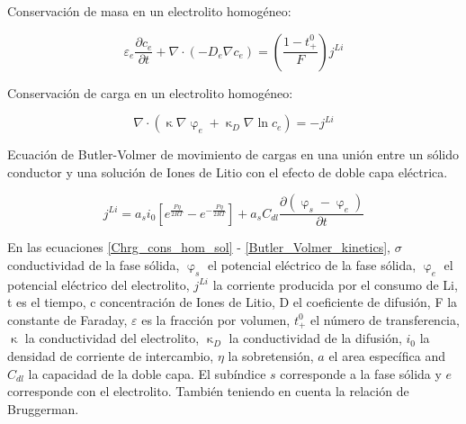 \documentclass[10pt,a4paper]{article}
\begin{document}
Conservación de masa en un electrolito homogéneo:\\

\begin{figure}[h!]
	\begin{center}
		\begin{equation}
		\varepsilon_e\frac{\partial c_e}{\partial t} + \nabla \cdot (-D_e\nabla c_e) = (\frac{1-t_+^0}{F})j^{Li}
		\label{Mass_cons_hom_electrolyte}
		\end{equation}	
	\end{center}
\end{figure}

Conservación de carga en un electrolito homogéneo:\\

\begin{figure}[h!]
	\begin{center}
		\begin{equation}
		\nabla \cdot (\upkappa \nabla \upvarphi_e + \upkappa_D \nabla \ln c_e) = -j^{Li}
		\label{Chrg_cons_hom_electrolyte}
		\end{equation}	
	\end{center}
\end{figure}

Ecuación de Butler-Volmer de movimiento de cargas en una unión entre un sólido conductor y una solución de Iones de Litio con el efecto de doble capa eléctrica. \\

\begin{figure}[h!]
	\begin{center}
		\begin{equation}
		 j^{Li} = a_si_0[{e^\frac{F\eta}{2RT}-e^{-\frac{F\eta}{2RT}}}]+ a_sC_{dl}\frac{\partial{(\upvarphi_s - \upvarphi_e)}}{\partial t}
		\label{Butler_Volmer_kinetics}
		\end{equation}	
	\end{center}
\end{figure}

En las ecuaciones \ref{Chrg_cons_hom_sol} - \ref{Butler_Volmer_kinetics}, $\sigma$  conductividad de la fase sólida, $\upvarphi_s$ el potencial eléctrico de la fase sólida, $\upvarphi_e$ el potencial eléctrico del electrolito, $j^{Li}$ la corriente producida por el consumo de Li, t es el tiempo, c concentración de Iones de Litio, D el coeficiente de difusión, F la constante de Faraday, $\varepsilon$ es la fracción por volumen,
$t_+^0$ el número de transferencia, $\upkappa$ la conductividad del electrolito,
$\upkappa_D$ la conductividad de la difusión, $i_0$ la densidad de corriente de intercambio, $\eta$ la sobretensión, $a$ el area específica and $C_{dl}$ la capacidad de la doble capa. El subíndice $s$ corresponde a la fase sólida y $e$ corresponde con el electrolito. También teniendo en cuenta la relación de Bruggerman.
\end{document}
